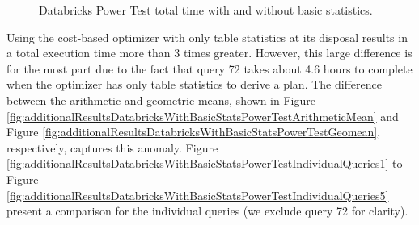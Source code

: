 \begin{figure}
   \begin{center}
   \end{center}
   \caption{Databricks Power Test total time with and without basic statistics.}
   \label{fig:additionalResultsDatabricksWithBasicStatsPowerTestTotalTime}
\end{figure}

Using the cost-based optimizer with only table statistics at its disposal results in a total execution time more than 3 times greater. However, this large difference is for the most part due to the fact that query 72 takes about 4.6 hours to complete when the optimizer has only table statistics to derive a plan. The difference between the arithmetic and geometric means, shown in Figure \ref{fig:additionalResultsDatabricksWithBasicStatsPowerTestArithmeticMean} and Figure \ref{fig:additionalResultsDatabricksWithBasicStatsPowerTestGeomean}, respectively, captures this anomaly. Figure \ref{fig:additionalResultsDatabricksWithBasicStatsPowerTestIndividualQueries1} to Figure \ref{fig:additionalResultsDatabricksWithBasicStatsPowerTestIndividualQueries5} present a comparison for the individual queries (we exclude query 72 for clarity).

